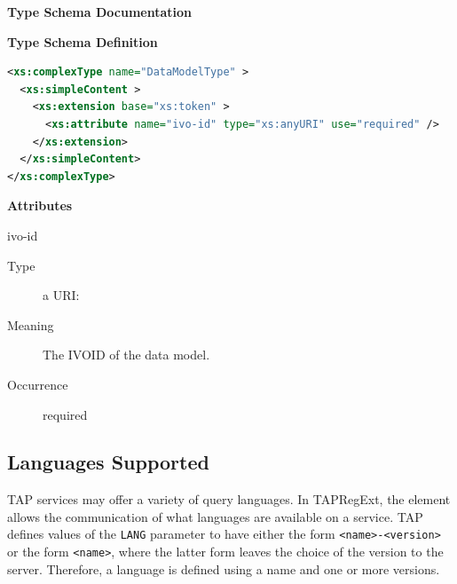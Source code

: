 \documentclass{ivoa}
\begin{document}
\begin{generated}
\begingroup
      	\renewcommand*\descriptionlabel[1]{%
      	\hbox to 5.5em{\emph{#1}\hfil}}\vspace{2ex}\noindent\textbf{ Type Schema Documentation}


\vspace{1ex}\noindent\textbf{ Type Schema Definition}

\begin{lstlisting}[language=XML,basicstyle=\footnotesize]
<xs:complexType name="DataModelType" >
  <xs:simpleContent >
    <xs:extension base="xs:token" >
      <xs:attribute name="ivo-id" type="xs:anyURI" use="required" />
    </xs:extension>
  </xs:simpleContent>
</xs:complexType>
\end{lstlisting}

\vspace{0.5ex}\noindent\textbf{ Attributes}

\begingroup\small\begin{bigdescription}
\item[ivo-id]
\begin{description}
\item[Type] a URI: 
\item[Meaning] 
            The IVOID of the data model.
            
\item[Occurrence] required
\end{description}


\end{bigdescription}\endgroup

\endgroup
\end{generated}


\subsection{Languages Supported}

\label{langs}

TAP services may offer a variety of query languages.  In TAPRegExt, the
 element allows the communication of what languages are
available on a service.  TAP defines values of the \texttt{LANG} parameter
to have either the form \texttt{<name>-<version>} or the form
\texttt{<name>}, where the latter form leaves the choice of the
version to the server.  Therefore, a language is defined using a name and one
or more versions.
\end{document}
